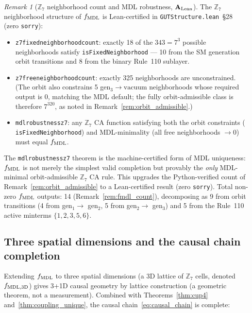 \documentclass[11pt]{article}
\theoremstyle{remark}
\newtheorem{remark}[theorem]{Remark}
\newcommand{\lean}[1]{%
  \penalty-100
  \begingroup\def\_{\textunderscore\allowbreak}\texttt{#1}\endgroup}
\newcommand{\CatAL}{\ensuremath{\textbf{A}_{\rm Lean}}}
\begin{document}
\begin{remark}[$\mathbb{Z}_7$ neighborhood count and MDL robustness, $\CatAL$]
\label{rem:z7_mdl_robustness}
The $\mathbb{Z}_7$ neighborhood structure of $f_{\rm MDL}$ is Lean-certified in
\lean{GUTStructure.lean}~\S28 (zero \texttt{sorry}):
\begin{itemize}
\item \lean{z7\_fixed\_neighborhood\_count}: exactly 18 of the $343 = 7^3$ possible
  neighborhoods satisfy \lean{isFixedNeighborhood} --- 10 from the SM generation
  orbit transitions and 8 from the binary Rule~110 sublayer.
\item \lean{z7\_free\_neighborhood\_count}: exactly 325 neighborhoods are
  unconstrained. (The orbit also constrains 5 gen$_3 \to \mathrm{vacuum}$
  neighborhoods whose required output is 0, matching the MDL default; the
  fully orbit-admissible class is therefore $7^{320}$, as noted in
  Remark~\ref{rem:orbit_admissible}.)
\item \lean{mdl\_robustness\_z7}: any $\mathbb{Z}_7$ CA function satisfying both
  the orbit constraints (\lean{isFixedNeighborhood}) and MDL-minimality (all
  free neighborhoods $\to 0$) must equal $f_{\rm MDL}$.
\end{itemize}
The \lean{mdl\_robustness\_z7} theorem is the machine-certified form of MDL uniqueness:
$f_{\rm MDL}$ is not merely the simplest valid completion but provably the \emph{only}
MDL-minimal orbit-admissible $\mathbb{Z}_7$ CA rule. This upgrades the Python-verified
count of Remark~\ref{rem:orbit_admissible} to a Lean-certified result (zero \texttt{sorry}).
Total non-zero $f_{\rm MDL}$ outputs: 14 (Remark~\ref{rem:fmdl_count}), decomposing as
9 from orbit transitions (4 from gen$_1 \to$ gen$_2$, 5 from gen$_2 \to$ gen$_3$) and
5 from the Rule~110 active minterms $\{1,2,3,5,6\}$.
\end{remark}

\subsection{Three spatial dimensions and the causal chain completion}

Extending $f_{\rm MDL}$ to three spatial dimensions (a 3D lattice of $\mathbb{Z}_7$ cells,
denoted $f_{\rm MDL, 3D}$) gives 3+1D causal geometry by lattice construction
(a geometric theorem, not a measurement). Combined with Theorems~\ref{thm:cup4}
and~\ref{thm:coupling_unique}, the causal chain~\eqref{eq:causal_chain} is complete:
\end{document}
